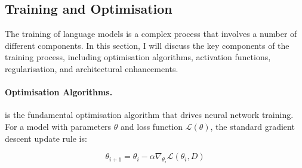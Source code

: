 

\subsection{Training and Optimisation}
\label{sec:optimization}

The training of language models is a complex process that involves a number of different components. In this section, I will discuss the key components of the training process, including optimisation algorithms, activation functions, regularisation, and architectural enhancements.

\paragraph{Optimisation Algorithms.} 

 is the fundamental optimisation algorithm that drives neural network training. For a model with parameters $\theta$ and loss function $\mathcal{L}(\theta)$, the standard gradient descent update rule is:

\begin{equation}
    \theta_{i+1} = \theta_i - \alpha \nabla_{\theta_i} \mathcal{L}(\theta_i, D)
\end{equation}


